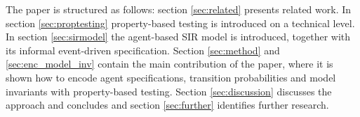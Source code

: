 The paper is structured as follows: section \ref{sec:related} presents related work. In section \ref{sec:proptesting} property-based testing is introduced on a technical level. In section \ref{sec:sirmodel} the agent-based SIR model is introduced, together with its informal event-driven specification. Section \ref{sec:method} and \ref{sec:enc_model_inv} contain the main contribution of the paper, where it is shown how to encode agent specifications, transition probabilities and model invariants with property-based testing. Section \ref{sec:discussion} discusses the approach and concludes and section \ref{sec:further} identifies further research.